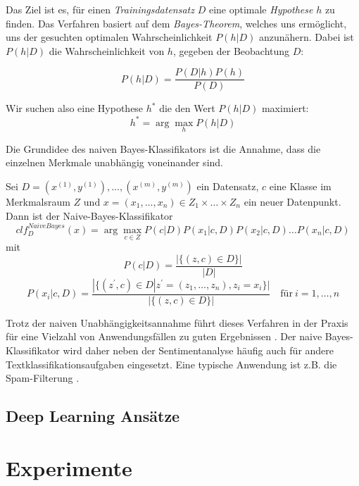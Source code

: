 \documentclass[researchlab,group,]{AIGpaper}
\begin{document}
Das Ziel ist es, für einen \textit{Trainingsdatensatz} $D$ eine optimale \textit{Hypothese} $h$ zu finden. Das Verfahren basiert auf dem \textit{Bayes-Theorem}, welches uns ermöglicht, uns der gesuchten optimalen Wahrscheinlichkeit $P(h|D)$ anzunähern. Dabei ist $P(h|D)$ die Wahrscheinlichkeit von $h$, gegeben der Beobachtung $D$:

\begin{equation*}
    P(h|D) = \frac{P(D|h)P(h)}{P(D)}
\end{equation*}

Wir suchen also eine Hypothese $h^*$ die den Wert $P(h|D)$ maximiert:
\begin{equation*}
    h^* = \arg\max_{h} P(h|D)
\end{equation*}

Die Grundidee des naiven Bayes-Klassifikators ist die Annahme, dass die einzelnen Merkmale unabhängig voneinander sind.

Sei $D = (x^{(1)}, y^{(1)}), \dots, (x^{(m)}, y^{(m)})$ ein Datensatz, $c$ eine Klasse im Merkmalsraum $Z$  und $x=(x_1, \dots,x_n)\in Z_1 \times \dots \times Z_n$ ein neuer Datenpunkt. Dann ist der Naive-Bayes-Klassifikator
\begin{equation*}
    clf_D^{NaiveBayes}(x) = \arg \max_{c\in Z} P(c|D)P(x_1|c,D)P(x_2|c,D) \dots P(x_n|c,D)
\end{equation*}
mit
\begin{equation*}
    P(c|D) = \frac{|\{(z,c)\in D\}|}{|D|}
\end{equation*}
\begin{equation*}
    P(x_i|c,D) = \frac{|\{(z^\prime,c)\in D| z^\prime = (z_1, \dots, z_n), z_i=x_i \}|}{|\{(z,c)\in D\}|} \quad \text{für} \: i = 1, \dots, n
\end{equation*}

Trotz der naiven Unabhängigkeitsannahme führt dieses Verfahren in der Praxis für eine Vielzahl von Anwendungsfällen zu guten Ergebnissen \cite{hand2001idiot}. Der naive Bayes-Klassifikator wird daher neben der Sentimentanalyse häufig auch für andere Textklassifikationsaufgaben eingesetzt. Eine typische Anwendung ist z.B. die Spam-Filterung \cite{sahami1998bayesian}.

\subsection{Deep Learning Ansätze}

\section{Experimente}
\end{document}
